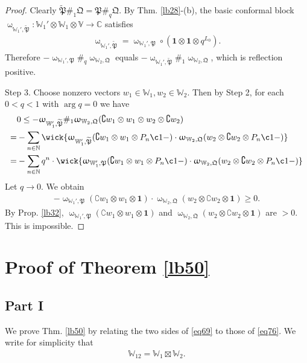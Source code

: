 \documentclass[11pt,b5paper,notitlepage]{article}
\theoremstyle{definition}
\theoremstyle{plain}
\newcommand{\fk}{\mathfrak}
\newcommand{\wtd}{\widetilde}
\newcommand{\id}{\mathbf{1}}
\newcommand{\Co}{\complement}
\newcommand{\Vbb}{\mathbb V}
\newcommand{\Wbb}{\mathbb W}
\newcommand{\Cbb}{\mathbb C}
\newcommand{\Nbb}{\mathbb N}
\numberwithin{equation}{section}
\begin{document}
\begin{proof}
Clearly $\wtd{\fk P}\#_1\fk Q=\fk P\#_q\fk Q$. By Thm. \ref{lb28}-(b), the basic conformal block $\upomega_{\Wbb_1',\wtd{\fk P}}:\Wbb_1'\otimes\Wbb_1\otimes\Vbb\rightarrow\Cbb$ satisfies
\begin{align*}
\upomega_{\Wbb_1',\wtd{\fk P}}=\upomega_{\Wbb_1',\fk P}\circ(\id\otimes\id\otimes q^{L_0}).
\end{align*}
Therefore $-\upomega_{\Wbb_1',\fk P}\#_q\upomega_{\Wbb_2,\fk Q}$ equals $-\upomega_{\Wbb_1',\wtd{\fk P}}\#_1\upomega_{\Wbb_2,\fk Q}$, which is reflection positive.

Step 3. Choose nonzero vectors $w_1\in\Wbb_1,w_2\in\Wbb_2$. Then by Step 2, for each $0<q<1$ with $\arg q=0$ we have
\begin{align*}
&0\leq -\upomega_{\Wbb_1',\wtd{\fk P}}\#_1\upomega_{\Wbb_2,\fk Q}(\Co w_1\otimes w_1\otimes w_2\otimes \Co w_2)\\
=&- \sum_{n\in\Nbb}\wick{\upomega_{\Wbb_1',\wtd{\fk P}}(\Co w_1\otimes w_1\otimes P_n\c1-)\cdot \upomega_{\Wbb_2,\fk Q}(w_2\otimes \Co w_2\otimes P_n\c1-)}\\
=&- \sum_{n\in\Nbb}q^n\cdot \wick{\upomega_{\Wbb_1',\fk P}(\Co w_1\otimes w_1\otimes P_n\c1-)\cdot \upomega_{\Wbb_2,\fk Q}(w_2\otimes \Co w_2\otimes P_n\c1-)}
\end{align*}
Let $q\rightarrow 0$. We obtain
\begin{align*}
-\upomega_{\Wbb_1',\fk P}(\Co w_1\otimes w_1\otimes \id)\cdot \upomega_{\Wbb_2,\fk Q}(w_2\otimes \Co w_2\otimes \id)\geq0.
\end{align*}
By Prop. \ref{lb32}, $\upomega_{\Wbb_1',\fk P}(\Co w_1\otimes w_1\otimes \id)$ and $\upomega_{\Wbb_2,\fk Q}(w_2\otimes \Co w_2\otimes \id)$ are $>0$. This is impossible.
\end{proof}




\section{Proof of Theorem \ref{lb50}}\label{lb68}


\subsection{Part I}

We prove Thm. \ref{lb50} by relating the two sides of \eqref{eq69} to those of \eqref{eq76}. We write for simplicity that
\begin{align*}
\Wbb_{12}=\Wbb_1\boxtimes\Wbb_2.
\end{align*}
\end{document}
